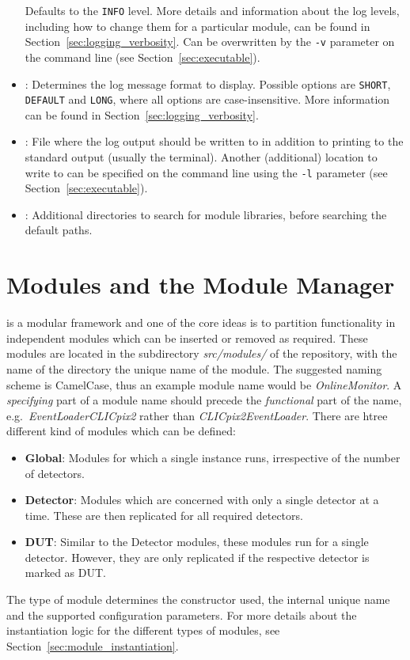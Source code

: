 \begin{itemize}
Defaults to the \texttt{INFO} level.
More details and information about the log levels, including how to change them for a particular module, can be found in Section~\ref{sec:logging_verbosity}.
Can be overwritten by the \texttt{-v} parameter on the command line (see Section~\ref{sec:executable}).
\item {}: Determines the log message format to display.
Possible options are \texttt{SHORT}, \texttt{DEFAULT} and \texttt{LONG}, where all options are case-insensitive.
More information can be found in Section~\ref{sec:logging_verbosity}.
\item {}: File where the log output should be written to in addition to printing to the standard output (usually the terminal).
Another (additional) location to write to can be specified on the command line using the \texttt{-l} parameter (see Section~\ref{sec:executable}).
\item {}: Additional directories to search for module libraries, before searching the default paths.
\end{itemize}

\section{Modules and the Module Manager}
\label{sec:module_manager}
\corry is a modular framework and one of the core ideas is to partition functionality in independent modules which can be inserted or removed as required.
These modules are located in the subdirectory \textit{src/modules/} of the repository, with the name of the directory the unique name of the module.
The suggested naming scheme is CamelCase, thus an example module name would be \textit{OnlineMonitor}.
A \emph{specifying} part of a module name should precede the \emph{functional} part of the name, e.g.\ \textit{EventLoaderCLICpix2} rather than \textit{CLICpix2EventLoader}.
There are htree different kind of modules which can be defined:
\begin{itemize}
    \item \textbf{Global}: Modules for which a single instance runs, irrespective of the number of detectors.
    \item \textbf{Detector}: Modules which are concerned with only a single detector at a time.
    These are then replicated for all required detectors.
    \item \textbf{DUT}: Similar to the Detector modules, these modules run for a single detector.
    However, they are only replicated if the respective detector is marked as DUT.
\end{itemize}
The type of module determines the constructor used, the internal unique name and the supported configuration parameters.
For more details about the instantiation logic for the different types of modules, see Section~\ref{sec:module_instantiation}.

